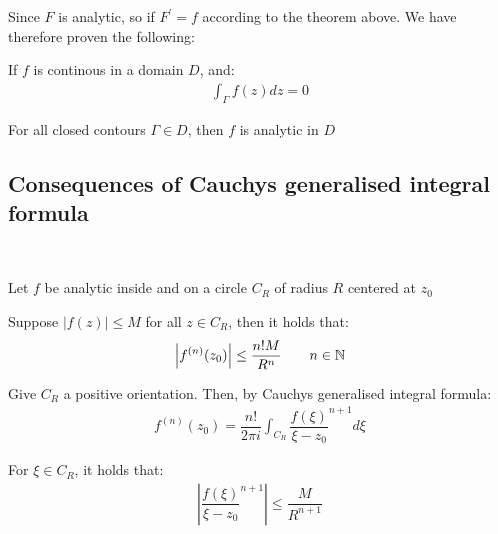 \par\bigskip
\noindent Since $F$ is analytic, so if $F^{\prime} = f$ according to the theorem above. We have therefore proven the following:
\par\bigskip
\begin{theo}[Morera]{}
  If $f$ is continous in a domain $D$, and:
  \begin{equation*}
    \begin{gathered}
      \int_{\Gamma}f(z)dz = 0
    \end{gathered}
  \end{equation*}\par
  \noindent For all closed contours $\Gamma\in D$, then $f$ is analytic in $D$
\end{theo}
\par\bigskip
\subsection{Consequences of Cauchys generalised integral formula}\hfill\\
\par\bigskip
\begin{theo}{}
  Let $f$ be analytic inside and on a circle $C_R$ of radius $R$ centered at $z_0$
  \par\bigskip
  \noindent Suppose $\left|f(z)\right|\leq M$ for all $z\in C_R$, then it holds that:
  \begin{equation*}
    \begin{gathered}
      \left|f^{(n)}(z_0)\right|\leq \dfrac{n!M}{R^n}\qquad n\in\mathbb{N}
    \end{gathered}
  \end{equation*}
\end{theo}
\par\bigskip
\begin{prf}[]{}
  Give $C_R$ a positive orientation. Then, by Cauchys generalised integral formula:
  \begin{equation*}
    \begin{gathered}
      f^{(n)}(z_0) = \dfrac{n!}{2\pi i}\int_{C_R}\dfrac{f(\xi)}{\xi-z_0}^{n+1}d\xi
    \end{gathered}
  \end{equation*}
  \par\bigskip
  \noindent For $\xi\in C_R$, it holds that:
  \begin{equation*}
    \begin{gathered}
      \left|\dfrac{f(\xi)}{\xi-z_0}^{n+1}\right|\leq\dfrac{M}{R^{n+1}}
    \end{gathered}
  \end{equation*}
\end{prf}
